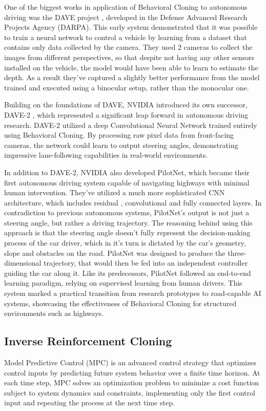 One of the biggest works in application of Behavioral Cloning to autonomous driving was the DAVE project \autocite{muller2004autonomous}, developed in the Defense Advanced Research Projects Agency (DARPA). This early system demonstrated that it was possible to train a neural network to control a vehicle by learning from a dataset that contains only data collected by the camera. They used 2 cameras to collect the images from different perspectives, so that despite not having any other sensors installed on the vehicle, the model would have been able to learn to estimate the depth. As a result they've captured a slightly better performance from the model trained and executed using a binocular setup, rather than the monocular one.

Building on the foundations of DAVE, NVIDIA introduced its own successor, DAVE-2 \autocite{bojarski2016endendlearningselfdriving}, which represented a significant leap forward in autonomous driving research. DAVE-2 utilized a deep Convolutional Neural Network trained entirely using Behavioral Cloning. By processing raw pixel data from front-facing cameras, the network could learn to output steering angles, demonstrating impressive lane-following capabilities in real-world environments.

In addition to DAVE-2, NVIDIA also developed PilotNet, which became their first autonomous driving system capable of navigating highways with minimal human intervention. They've utilized a much more sophisticated CNN architecture, which includes residual \autocite{he2015deepresiduallearningimage}, convolutional and fully connected layers. In contradiction to previous autonomous systems, PilotNet's output is not just a steering angle, but rather a driving trajectory. The reasoning behind using this approach is that the steering angle doesn't fully represent the decision-making process of the car driver, which in it's turn is dictated by the car's geometry, slope and obstacles on the road. PilotNet was designed to produce the three-dimensional trajectory, that would then be fed into an independent controller guiding the car along it. Like its predecessors, PilotNet followed an end-to-end learning paradigm, relying on supervised learning from human drivers. This system marked a practical transition from research prototypes to road-capable AI systems, showcasing the effectiveness of Behavioral Cloning for structured environments such as highways.

\subsection{Inverse Reinforcement Cloning}

Model Predictive Control (MPC) is an advanced control strategy that optimizes control inputs by predicting future system behavior over a finite time horizon. At each time step, MPC solves an optimization problem to minimize a cost function subject to system dynamics and constraints, implementing only the first control input and repeating the process at the next time step.
